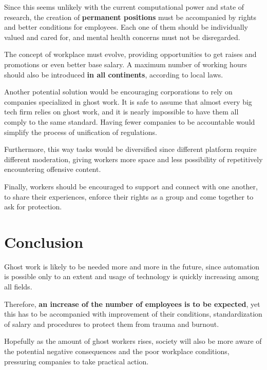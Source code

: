 \documentclass[12pt]{article}
\begin{document}
	Since this seems unlikely with the current computational power and state of research, the creation of \textbf{permanent positions} must be accompanied by rights and better conditions for employees. Each one of them should be individually valued and cared for, and mental health concerns must not be disregarded.
	
	The concept of workplace must evolve, providing opportunities to get raises and promotions or even better base salary. A maximum number of working hours should also be introduced \textbf{in all continents}, according to local laws. 
	
	Another potential solution would be encouraging corporations to rely on companies specialized in ghost work. It is safe to assume that almost every big tech firm relies on ghost work, and it is nearly impossible to have them all comply to the same standard. Having fewer companies to be accountable would simplify the process of unification of regulations.
	
	Furthermore, this way tasks would be diversified since different platform require different moderation, giving workers more space and less possibility of repetitively encountering offensive content. 
	
	Finally, workers should be encouraged to support and connect with one another, to share their experiences, enforce their rights as a group and come together to ask for protection. 
	
	\section{Conclusion}
	Ghost work is likely to be needed more and more in the future, since automation is possible only to an extent and usage of technology is quickly increasing among all fields. 
	
	Therefore, \textbf{an increase of the number of employees is to be expected}, yet this has to be accompanied with improvement of their conditions, standardization of salary and procedures to protect them from trauma and burnout. 
	
	Hopefully as the amount of ghost workers rises, society will also be more aware of the potential negative consequences and the poor workplace conditions, pressuring companies to take practical action.
	
\end{document}
